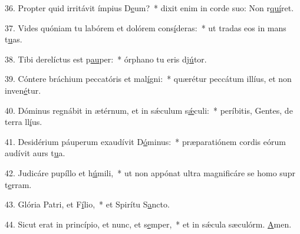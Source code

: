 36. Propter quid irritávit ímpius D\uline{e}um?~* dixit enim in corde suo: Non r\uline{quí}ret.\par 
37. Vides quóniam tu labórem et dolórem cons\uline{í}deras:~* ut tradas eos in mans t\uline{u}as.\par 
38. Tibi derelíctus est p\uline{au}per:~* órphano tu eris dj\uline{ú}tor.\par 
39. Cóntere bráchium peccatóris et mal\uline{í}gni:~* quærétur peccátum illíus, et non inven\uline{é}tur.\par 
40. Dóminus regnábit in ætérnum, et in sǽculum s\uline{ǽ}culi:~* períbitis, Gentes, de terra ll\uline{í}us.\par 
41. Desidérium páuperum exaudívit D\uline{ó}minus:~* præparatiónem cordis eórum audívit aurs t\uline{u}a.\par 
42. Judicáre pupíllo et h\uline{ú}mili,~* ut non appónat ultra magnificáre se homo supr t\uline{e}rram.\par 
43. Glória Patri, et F\uline{í}lio,~* et Spirítu S\uline{a}ncto.\par 
44. Sicut erat in princípio, et nunc, et s\uline{e}mper,~* et in sǽcula sæculórm. \uline{A}men.\par 
